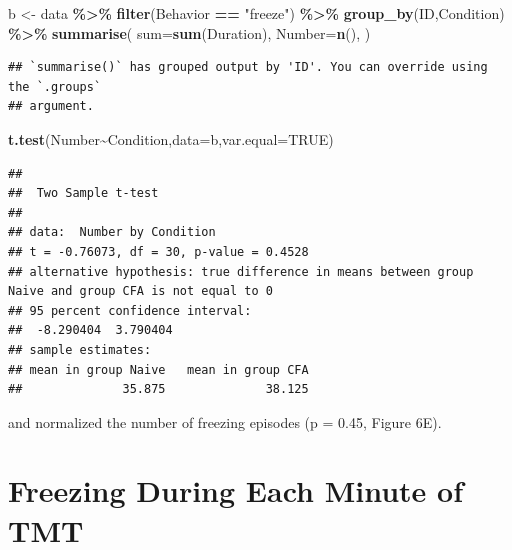 \documentclass[
]{book}
\newenvironment{Shaded}{\begin{snugshade}}{\end{snugshade}}
\newcommand{\AttributeTok}[1]{\textcolor[rgb]{0.13,0.29,0.53}{#1}}
\newcommand{\ConstantTok}[1]{\textcolor[rgb]{0.56,0.35,0.01}{#1}}
\newcommand{\FunctionTok}[1]{\textcolor[rgb]{0.13,0.29,0.53}{\textbf{#1}}}
\newcommand{\NormalTok}[1]{#1}
\newcommand{\OtherTok}[1]{\textcolor[rgb]{0.56,0.35,0.01}{#1}}
\newcommand{\SpecialCharTok}[1]{\textcolor[rgb]{0.81,0.36,0.00}{\textbf{#1}}}
\newcommand{\StringTok}[1]{\textcolor[rgb]{0.31,0.60,0.02}{#1}}
\begin{document}
\begin{Shaded}
\begin{Highlighting}[]
\NormalTok{b }\OtherTok{\textless{}{-}}\NormalTok{ data  }\SpecialCharTok{\%\textgreater{}\%}
  \FunctionTok{filter}\NormalTok{(Behavior }\SpecialCharTok{==} \StringTok{"freeze"}\NormalTok{) }\SpecialCharTok{\%\textgreater{}\%}
  \FunctionTok{group\_by}\NormalTok{(ID,Condition) }\SpecialCharTok{\%\textgreater{}\%}
  \FunctionTok{summarise}\NormalTok{(}
    \AttributeTok{sum=}\FunctionTok{sum}\NormalTok{(Duration),}
    \AttributeTok{Number=}\FunctionTok{n}\NormalTok{(),}
\NormalTok{  ) }
\end{Highlighting}
\end{Shaded}

\begin{verbatim}
## `summarise()` has grouped output by 'ID'. You can override using the `.groups`
## argument.
\end{verbatim}

\begin{Shaded}
\begin{Highlighting}[]
\FunctionTok{t.test}\NormalTok{(Number}\SpecialCharTok{\textasciitilde{}}\NormalTok{Condition,}\AttributeTok{data=}\NormalTok{b,}\AttributeTok{var.equal=}\ConstantTok{TRUE}\NormalTok{)}
\end{Highlighting}
\end{Shaded}

\begin{verbatim}
## 
##  Two Sample t-test
## 
## data:  Number by Condition
## t = -0.76073, df = 30, p-value = 0.4528
## alternative hypothesis: true difference in means between group Naive and group CFA is not equal to 0
## 95 percent confidence interval:
##  -8.290404  3.790404
## sample estimates:
## mean in group Naive   mean in group CFA 
##              35.875              38.125
\end{verbatim}

and normalized the number of freezing episodes (p = 0.45, Figure 6E).

\section*{Freezing During Each Minute of TMT}\label{freezing-during-each-minute-of-tmt}
\end{document}
